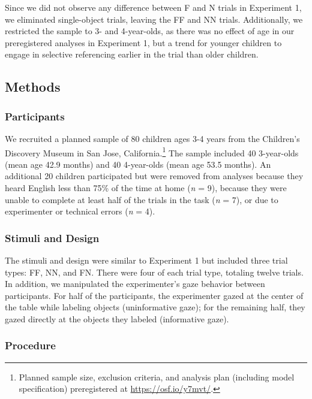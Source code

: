 \documentclass[english,man]{apa6}
\theoremstyle{definition}
\theoremstyle{definition}
\theoremstyle{definition}
\theoremstyle{remark}
\begin{document}
Since we did not observe any difference between F and N trials in
Experiment 1, we eliminated single-object trials, leaving the FF and NN
trials. Additionally, we restricted the sample to 3- and 4-year-olds, as
there was no effect of age in our preregistered analyses in Experiment
1, but a trend for younger children to engage in selective referencing
earlier in the trial than older children.

\subsection{Methods}\label{methods-1}

\subsubsection{Participants}\label{participants-1}

We recruited a planned sample of 80 children ages 3-4 years from the
Children's Discovery Museum in San Jose, California.\footnote{Planned
  sample size, exclusion criteria, and analysis plan (including model
  specification) preregistered at \url{https://osf.io/y7mvt/}.} The
sample included 40 3-year-olds (mean age 42.9 months) and 40 4-year-olds
(mean age 53.5 months). An additional 20 children participated but were
removed from analyses because they heard English less than 75\% of the
time at home (\emph{n} = 9), because they were unable to complete at
least half of the trials in the task (\emph{n} = 7), or due to
experimenter or technical errors (\emph{n} = 4).

\subsubsection{Stimuli and Design}\label{stimuli-and-design-1}

The stimuli and design were similar to Experiment 1 but included three
trial types: FF, NN, and FN. There were four of each trial type,
totaling twelve trials. In addition, we manipulated the experimenter's
gaze behavior between participants. For half of the participants, the
experimenter gazed at the center of the table while labeling objects
(uninformative gaze); for the remaining half, they gazed directly at the
objects they labeled (informative gaze).

\subsubsection{Procedure}\label{procedure-1}
\end{document}
